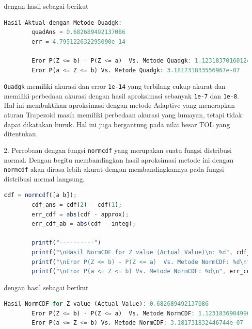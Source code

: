 \documentclass[journal,12pt,onecolumn,a4paper]{IEEEtran}
\begin{document}
dengan hasil sebagai berikut

\begin{center}
	\begin{lstlisting}[language=Octave]
		Hasil Aktual dengan Metode Quadgk: 
		quadAns = 0.682689492137086
		err = 4.795122632295090e-14  

		Eror P(Z <= b) - P(Z <= a)  Vs. Metode Quadgk: 1.123183701601249e-08
		Eror P(a <= Z <= b) Vs. Metode Quadgk: 3.181731833556967e-07
	\end{lstlisting}
\end{center}

\lstinline{Quadgk} memiliki akurasi dan error \lstinline{1e-14} yang terbilang cukup akurat dan memiliki perbedaan akurasi dengan hasil aproksimasi sebanyak \lstinline{1e-7} dan \lstinline{1e-8}. Hal ini membuktikan aproksimasi dengan metode Adaptive yang menerapkan aturan Trapezoid masih memiliki perbedaan akurasi yang lumayan, tetapi tidak dapat dikatakan buruk. Hal ini juga bergantung pada nilai besar TOL yang ditentukan.


2. Percobaan dengan fungsi \lstinline{normcdf} yang merupakan suatu fungsi distribusi normal. Dengan begitu membandingkan hasil aproksimasi metode ini dengan \lstinline{normcdf} akan dirasa lebih akurat dengan membandingkannya pada fungsi distribusi normal langsung.

\begin{center}
	\begin{lstlisting}[language=Octave]
		cdf = normcdf([a b]);
		cdf_ans = cdf(2) - cdf(1);
		err_cdf = abs(cdf - approx);
		err_cdf_ab = abs(cdf - integ);

		printf("----------")
		printf("\nHasil NormCDF for Z value (Actual Value)\n: %d", cdf_ans)
		printf("\nEror P(Z <= b) - P(Z <= a)  Vs. Metode NormCDF: %d\n", err_cdf)
		printf("\nEror P(a <= Z <= b) Vs. Metode NormCDF: %d\n", err_cdf_ab)
	\end{lstlisting}
\end{center}

dengan hasil sebagai berikut

\begin{center}
	\begin{lstlisting}[language=Octave]
		Hasil NormCDF for Z value (Actual Value): 0.682689492137086
		Eror P(Z <= b) - P(Z <= a)  Vs. Metode NormCDF: 1.123183690499019e-08
		Eror P(a <= Z <= b) Vs. Metode NormCDF: 3.181731832446744e-07
	\end{lstlisting}
\end{center}
\end{document}
